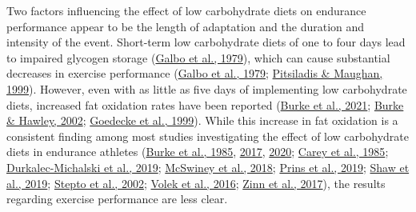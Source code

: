 \documentclass[]{cik}%
\begin{document}
Two factors influencing the effect of low carbohydrate diets on
endurance performance appear to be the length of adaptation and the
duration and intensity of the event. Short-term low carbohydrate diets
of one to four days lead to impaired glycogen storage
(\protect\hyperlink{ref-12}{Galbo et al., 1979}), which can cause
substantial decreases in exercise performance
(\protect\hyperlink{ref-12}{Galbo et al., 1979};
\protect\hyperlink{ref-13}{Pitsiladis \& Maughan, 1999}). However, even
with as little as five days of implementing low carbohydrate diets,
increased fat oxidation rates have been reported
(\protect\hyperlink{ref-16}{Burke et al., 2021};
\protect\hyperlink{ref-15}{Burke \& Hawley, 2002};
\protect\hyperlink{ref-14}{Goedecke et al., 1999}). While this increase
in fat oxidation is a consistent finding among most studies
investigating the effect of low carbohydrate diets in endurance athletes
(\protect\hyperlink{ref-18}{Burke et al., 1985},
\protect\hyperlink{ref-19}{2017}, \protect\hyperlink{ref-20}{2020};
\protect\hyperlink{ref-6}{Carey et al., 1985};
\protect\hyperlink{ref-21}{Durkalec-Michalski et al., 2019};
\protect\hyperlink{ref-22}{McSwiney et al., 2018};
\protect\hyperlink{ref-23}{Prins et al., 2019};
\protect\hyperlink{ref-26}{Shaw et al., 2019};
\protect\hyperlink{ref-24}{Stepto et al., 2002};
\protect\hyperlink{ref-17}{Volek et al., 2016};
\protect\hyperlink{ref-25}{Zinn et al., 2017}), the results regarding
exercise performance are less clear.
\end{document}
